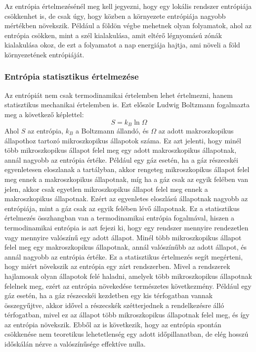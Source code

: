 \documentclass[../main.tex]{subfiles}
\begin{document}
Az entrópia értelmezésénél meg kell jegyezni, hogy egy lokális rendszer entrópiája csökkenhet is, de csak úgy, hogy közben a környezete entrópiája nagyobb mértékben növekszik. Például
a földön végbe mehetnek olyan folyamatok, ahol az entrópia csökken, mint a szél kialakulása, amit eltérő légnyomású zónák kialakulása okoz, de ezt a folyamatot a nap energiája hajtja, ami növeli a föld környezetének entrópiáját.

\subsubsection*{Entrópia statisztikus értelmezése}
Az entrópiát nem csak termodinamikai értelemben lehet értelmezni, hanem statisztikus mechanikai értelemben is. Ezt először Ludwig Boltzmann fogalmazta meg a következő képlettel:
\begin{equation}
    S = k_B \ln{\Omega}
\end{equation}
Ahol $S$ az entrópia, $k_B$ a Boltzmann állandó, és $\Omega$ az adott makroszkopikus állapothoz tartozó mikroszkopikus állapotok száma.
Ez azt jelenti, hogy minél több mikroszkopikus állapot felel meg egy adott makroszkopikus állapotnak, annál nagyobb az entrópia értéke.
Például egy gáz esetén, ha a gáz részecskéi egyenletesen eloszlanak a tartályban, akkor rengeteg mikroszkopikus állapot felel meg ennek a makroszkopikus állapotnak, míg ha a gáz csak az egyik felében van jelen, akkor csak egyetlen mikroszkopikus állapot felel meg ennek a makroszkopikus állapotnak.
Ezért az egyenletes eloszlású állapotnak nagyobb az entrópiája, mint a gáz csak az egyik felében lévő állapotnak.
\newline
\newline
Ez a statisztikus értelmezés összhangban van a termodinamikai entrópia fogalmával, hiszen a termodinamikai entrópia is azt fejezi ki, hogy egy rendszer mennyire rendezetlen vagy mennyire valószínű egy adott állapot.
Minél több mikroszkopikus állapot felel meg egy makroszkopikus állapotnak, annál valószínűbb az adott állapot, és annál nagyobb az entrópia értéke.
\newline
\newline
Ez a statisztikus értelmezés segít megérteni, hogy miért növekszik az entrópia egy zárt rendszerben. Mivel a rendszerek hajlamosak olyan állapotok felé haladni, amelyek több mikroszkopikus állapotnak felelnek meg,
ezért az entrópia növekedése természetes következmény. Például egy gáz esetén, ha a gáz részecskéi kezdetben egy kis térfogatban vannak összegyűjtve, akkor idővel a részecskék szétterjednek a rendelkezésre álló térfogatban,
mivel ez az állapot több mikroszkopikus állapotnak felel meg, és így az entrópia növekszik.
\newline
\newline
Ebből az is következik, hogy az entrópia spontán csökkenése nem teoretikus lehetetlenség egy adott időpillanatban, de elég hosszú időskálán nézve a valószínűsége effektíve nulla.
\end{document}

